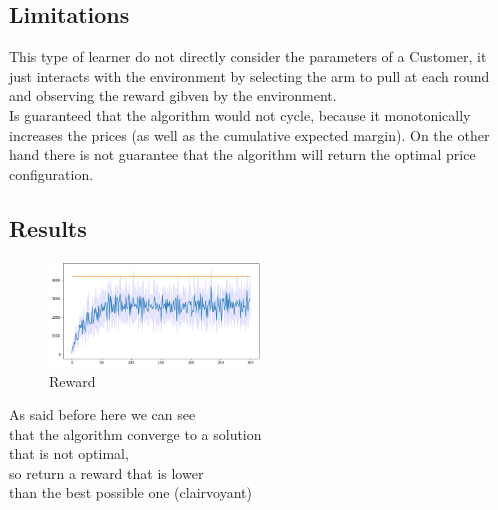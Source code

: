 \subsection{Limitations}
This type of learner do not directly consider the parameters of a Customer, it just interacts with the environment by selecting the arm to pull at each round and observing the reward gibven by the environment.\\
Is guaranteed that the algorithm would not cycle, because it monotonically increases the prices (as well as the cumulative expected margin). On the other hand there is not guarantee that the algorithm will return the optimal price configuration.








\subsection{Results}
\begin{multicols}{2}
    \begin{figure}[H]
        \begin{center}
        \includegraphics[width=0.5\textwidth]{img/reward2.png}
        \caption{Reward}
        \label{fig:reward2}
        \end{center}
    \end{figure}
    \columnbreak
As said before here we can see\\ that the algorithm converge to a solution\\ that is not optimal,\\ so return a reward that is lower \\than the best possible one (clairvoyant)
\end{multicols}

